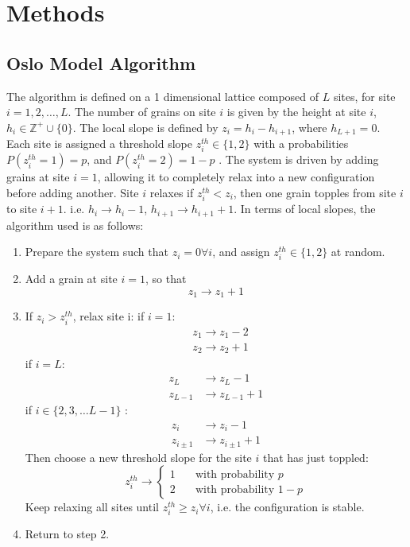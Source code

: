 \documentclass[twoside]{article}
\begin{document}

\section{Methods}
\subsection{Oslo Model Algorithm\cite{cc}}
The algorithm is defined on a 1 dimensional lattice composed of $L$ sites, for site $i=1,2,\ldots,L$. The number of grains on site $i$ is given by the height at site $i$, $h_i \in \mathbb{Z}^+ \cup \{ 0 \}$. The local slope is defined by $z_i=h_i - h_{i+1}$, where $h_{L+1} = 0$. Each site is assigned a threshold slope $z_i^{th} \in \{ 1, 2 \}$ with a probabilities $P(z_i^{th} = 1) = p$, and $P(z_i^{th} =2) = 1-p$ . The system is driven by adding grains at site $i=1$, allowing it to completely relax into a new configuration before adding another. Site $i$ relaxes if $z_i^{th}<z_i$, then one grain topples from site $i$ to site $i+1$. i.e. $h_i \to h_i -1$, $h_{i+1} \to h_{i+1} +1$. In terms of local slopes, the algorithm used is as follows:
\begin{enumerate}
\item Prepare the system such that $z_i = 0 \forall i$, and assign $z_i^{th} \in \{ 1,2 \} $ at random.
\item Add a grain at site $i=1$, so that
\[
z_1 \to z_1+1
\]
\item If $z_i>z_i^{th}$, relax site i:
if $i=1$:
\begin{align*}
&z_1 \to z_1 -2 \\
& z_2 \to z_2 +1
\end{align*}
if $i=L$:
\begin{align*}
z_{L} &\to z_{L} -1 \\
 z_{L-1} & \to z_{L-1} +1
\end{align*}
if $i \in \{ 2, 3, \ldots L-1 \} $ :
\begin{align*}
z_i &\to z_i - 1 \\
z_{i \pm 1} & \to z_{i\pm 1} +1
\end{align*}
Then choose a new threshold slope for the site $i$ that has just toppled:
\[
z_i^{th} \to \left\{ \begin{matrix} 1 & \quad \text{with probability } p \\ 2 & \quad \text{with probability } 1-p \end{matrix} \right.
\]
Keep relaxing all sites until $z_i^{th}\geq z_i \forall i $, i.e. the configuration is stable.
\item Return to step 2.
\end{enumerate}
\end{document}
